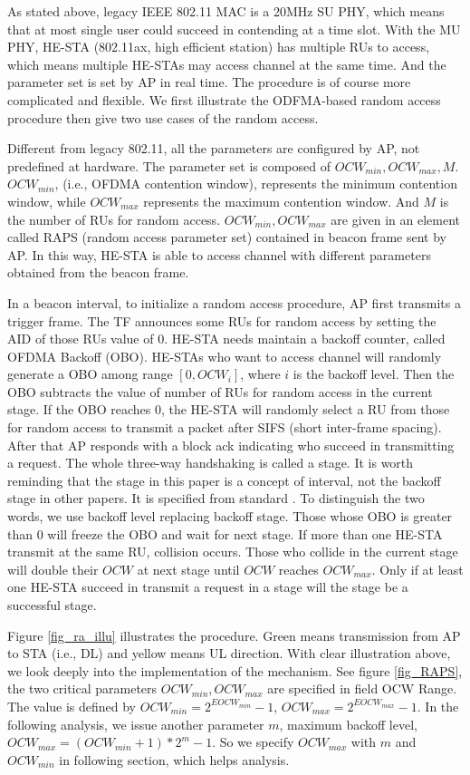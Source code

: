 \documentclass[journal]{IEEEtran}
\begin{document}
As stated above, legacy IEEE 802.11 MAC is a 20MHz SU PHY, which means that at most single user could succeed in contending at a time slot.
With the MU PHY, HE-STA (802.11ax, high efficient station) has multiple RUs to access, which means multiple HE-STAs may access channel at the same time.
And the parameter set is set by AP in real time.
The procedure is of course more complicated and flexible.
We first illustrate the ODFMA-based random access procedure then give two use cases of the random access.

Different from legacy 802.11, all the parameters are configured by AP, not predefined at hardware. 
The parameter set is composed of $OCW_{min}, OCW_{max}, M$. $OCW_{min}$, (i.e., OFDMA contention window), represents the minimum contention window, while $OCW_{max}$ represents the maximum contention window. 
And $M$ is the number of RUs for random access. $OCW_{min}, OCW_{max}$ are given in an element called RAPS (random access parameter set) contained in beacon frame sent by AP.
In this way, HE-STA is able to access channel with different parameters obtained from the beacon frame. 


In a beacon interval, to initialize a random access procedure, AP first transmits a trigger frame. 
The TF announces some RUs for random access by setting the AID of those RUs value of 0. 
HE-STA needs maintain a backoff counter, called OFDMA Backoff (OBO). 
HE-STAs who want to access channel will randomly generate a OBO among range $[0, OCW_i]$, where $i$ is the backoff level. 
Then the OBO subtracts the value of number of RUs for random access in the current stage. 
If the OBO reaches 0, the HE-STA will randomly select a RU from those for random access to transmit a packet after SIFS (short inter-frame spacing). 
After that AP responds with a block ack indicating who succeed in transmitting a request. The whole three-way handshaking is called a stage. 
It is worth reminding that the stage in this paper is a concept of interval, not the backoff stage in other papers. 
It is specified from standard \cite{draft_ax}. To distinguish the two words, we use backoff level replacing backoff stage. 
Those whose OBO is greater than 0 will freeze the OBO and wait for next stage.  
If more than one HE-STA transmit at the same RU, collision occurs. 
Those who collide in the current stage will double their $OCW$ at next stage until $OCW$ reaches $OCW_{max}$. 
Only if at least one HE-STA succeed in transmit a request in a stage will the stage be a successful stage. 

Figure \ref{fig_ra_illu} illustrates the procedure. Green means transmission from AP to STA (i.e., DL) and yellow means UL direction. 
With clear illustration above, we look deeply into the implementation of the mechanism.
See figure \ref{fig_RAPS}, the two critical parameters $OCW_{min},OCW_{max}$ are specified in field OCW Range. 
The value is defined by $OCW_{min} = 2^{EOCW_{min}}-1$, $OCW_{max} = 2^{EOCW_{max}}-1$. 
In the following analysis, we issue another parameter $m$, maximum backoff level, $OCW_{max} = (OCW_{min}+1)*2^m-1$. So we specify $OCW_{max}$ with $m$ and $OCW_{min}$ in following section, which helps analysis.
\end{document}
